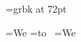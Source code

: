 \nopagenumbers

%
%

\font\foo=grbk at 72pt

=\hbox{\foo W{}e}
=\hbox{\vbox to }
=\hbox{\foo We}

\hbox{}

\bye

